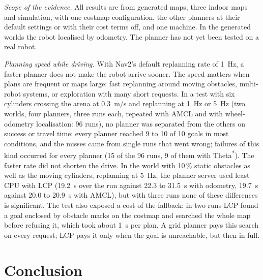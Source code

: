 \documentclass[conference]{IEEEtran}
\newcommand{\lcp}{LCP}
\begin{document}
\emph{Scope of the evidence.} All results are from generated maps, three indoor
maps and simulation, with one costmap configuration, the other planners at their
default settings or with their cost terms off, and one machine. In the generated worlds the robot localised
by odometry. The planner has not yet been tested on a real robot.

\emph{Planning speed while driving.} With Nav2's default replanning rate of
\SI{1}{Hz}, a faster planner does not make the robot arrive sooner. The speed
matters when plans are frequent or maps large: fast replanning around moving
obstacles, multi-robot systems, or exploration with many short requests.
In a test with six cylinders crossing the arena at \SI{0.3}{m/s} and
replanning at \SI{1}{Hz} or \SI{5}{Hz} (two worlds, four planners, three runs
each, repeated with AMCL and with wheel-odometry localisation: 96 runs), no
planner was separated from the others on success or travel time: every planner
reached 9 to 10 of 10 goals in most conditions, and the misses came from single
runs that went wrong; failures of this kind occurred for every planner (15 of the
96 runs, 9 of them with Theta\textsuperscript{*}). The faster rate did not
shorten the drive. In the world with 10\,\% static obstacles as well as the moving
cylinders, replanning at \SI{5}{Hz}, the planner server used least CPU with
\lcp{} (\SI{19.2}{s} over the run against 22.3 to \SI{31.5}{s} with odometry,
\SI{19.7}{s} against 20.0 to \SI{20.9}{s} with AMCL), but with three runs none of
these differences is significant. The test also exposed a cost of the fallback:
in two runs \lcp{} found a goal enclosed by obstacle marks on the costmap and
searched the whole map before refusing it, which took about \SI{1}{s} per plan.
A grid planner pays this search on every request; \lcp{} pays it only when the
goal is unreachable, but then in full.

\section{Conclusion}
\end{document}
